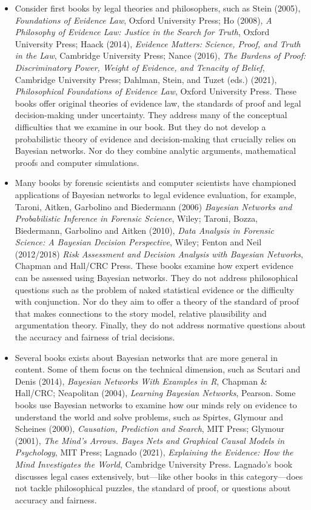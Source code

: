 \documentclass[
  10pt,
  dvipsnames,enabledeprecatedfontcommands]{scrartcl}
\begin{document}
\begin{itemize}

\item Consider first books by legal theories and philosophers, such as 
Stein (2005), \textit{Foundations of Evidence Law}, Oxford University Press; Ho (2008), \textit{A Philosophy of Evidence Law: Justice in the Search for Truth}, Oxford University Press; Haack (2014), \textit{Evidence Matters: Science, Proof, and Truth in the Law}, Cambridge University Press; Nance (2016), \textit{The Burdens of Proof: Discriminatory Power, Weight of Evidence, and Tenacity of Belief}, Cambridge University Press;    Dahlman, Stein, and Tuzet (eds.) (2021), \textit{Philosophical Foundations of Evidence Law}, Oxford University Press.
These books offer original theories of evidence law, the standards of proof and legal decision-making  under uncertainty.   They address many of the conceptual difficulties that we examine in our book. But they do not develop a probabilistic theory of evidence and decision-making that crucially relies on Bayesian networks.  Nor do they combine analytic arguments, mathematical proofs and computer simulations. 

\item  Many books by forensic scientists and computer scientists  have championed applications of Bayesian networks to legal evidence evaluation, for example, Taroni, Aitken, Garbolino and Biedermann (2006) \textit{Bayesian Networks and Probabilistic Inference in Forensic Science}, Wiley;   Taroni,  Bozza,  Biedermann, Garbolino and  Aitken (2010), \textit{Data Analysis in Forensic Science: A Bayesian Decision Perspective}, Wiley; Fenton and Neil (2012/2018) \textit{Risk Assessment and Decision Analysis with Bayesian Networks}, Chapman and Hall/CRC Press. These books examine how expert evidence can be assessed using Bayesian networks. They do not address philosophical questions such as the problem of naked statistical evidence or the difficulty with conjunction. Nor do they aim to offer a theory of the standard of proof that makes connections to the story model, relative plausibility and argumentation theory. Finally, they do not address normative questions about the accuracy and fairness of trial decisions. 

\item Several books exists about Bayesian networks that are more general in content. Some of them focus on the technical dimension,  such as Scutari and  Denis (2014), \textit{Bayesian Networks With Examples in R}, Chapman \& Hall/CRC;  
Neapolitan (2004), \emph{Learning Bayesian Networks}, Pearson. Some books use Bayesian networks to examine how our minds rely on evidence to understand the world and solve problems, such as Spirtes, Glymour and Scheines (2000), \emph{Causation, Prediction and Search}, MIT Press; Glymour (2001),  \emph{The Mind's Arrows. Bayes Nets and Graphical Causal Models in Psychology}, MIT Press; Lagnado (2021), \textit{Explaining the Evidence: How the Mind Investigates the World}, Cambridge University Press. Lagnado's book discusses legal cases extensively, but---like other books in this category---does not tackle philosophical puzzles, the standard of proof, or questions about accuracy and fairness.


\end{itemize}
\end{document}
